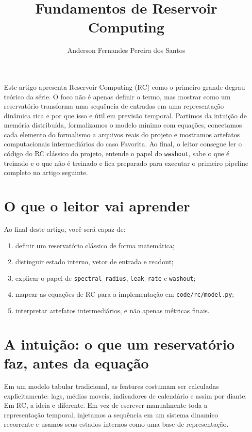 \documentclass[12pt]{article}
\title{Fundamentos de Reservoir Computing}
\author{Anderson Fernandes Pereira dos Santos}
\providecommand{\tightlist}{%
  \setlength{\itemsep}{0pt}\setlength{\parskip}{0pt}}
\begin{document}
\maketitle

\begin{resumo}
Este artigo apresenta Reservoir Computing (RC) como o primeiro grande degrau teórico da série. O foco não é apenas definir o termo, mas mostrar como um reservatório transforma uma sequência de entradas em uma representação dinâmica rica e por que isso e útil em previsão temporal. Partimos da intuição de memória distribuída, formalizamos o modelo mínimo com equações, conectamos cada elemento do formalismo a arquivos reais do projeto e mostramos artefatos computacionais intermediários do caso Favorita. Ao final, o leitor consegue ler o código do RC clássico do projeto, entende o papel do \texttt{washout}, sabe o que é treinado e o que não é treinado e fica preparado para executar o primeiro pipeline completo no artigo seguinte.
\end{resumo}

\section{O que o leitor vai aprender}\label{1-o-que-o-leitor-vai-aprender}

Ao final deste artigo, você será capaz de:

\begin{enumerate}
\def\labelenumi{\arabic{enumi}.}
\tightlist
\item
  definir um reservatório clássico de forma matemática;
\item
  distinguir estado interno, vetor de entrada e readout;
\item
  explicar o papel de \texttt{spectral\_radius}, \texttt{leak\_rate} e \texttt{washout};
\item
  mapear as equações de RC para a implementação em \texttt{code/rc/model.py};
\item
  interpretar artefatos intermediários, e não apenas métricas finais.
\end{enumerate}

\section{A intuição: o que um reservatório faz, antes da equação}\label{2-a-intuiuxe7uxe3o-o-que-um-reservatuxf3rio-faz-antes-da-equauxe7uxe3o}

Em um modelo tabular tradicional, as features costumam ser calculadas explicitamente: lags, médias moveis, indicadores de calendário e assim por diante. Em RC, a ideia e diferente. Em vez de escrever manualmente toda a representação temporal, injetamos a sequência em um sistema dinamico recorrente e usamos seus estados internos como uma base de representação.
\end{document}
